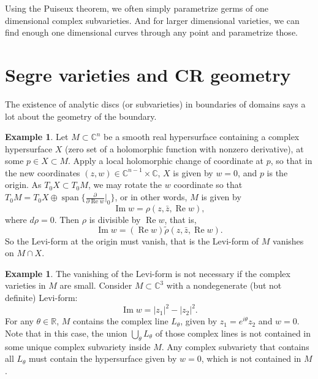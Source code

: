 \documentclass[12pt,openany]{book}
\renewcommand{\Re}{\operatorname{Re}}
\renewcommand{\Im}{\operatorname{Im}}
\newcommand{\abs}[1]{\left\lvert {#1} \right\rvert}
\newcommand{\C}{{\mathbb{C}}}
\newcommand{\R}{{\mathbb{R}}}
\newcommand{\sectionnewpage}{}
\theoremstyle{plain}
\theoremstyle{remark}
\theoremstyle{definition}
\theoremstyle{exercise}
\theoremstyle{example}
\newtheorem{example}[thm]{Example}
\begin{document}
Using the Puiseux theorem, we often simply parametrize germs
of one dimensional complex subvarieties.  
And for larger dimensional varieties, we can find
enough one dimensional curves through any point and parametrize those.


\sectionnewpage
\section{Segre varieties and CR geometry} \label{sec:crgeomcr}

The existence of analytic discs (or subvarieties)
in boundaries of domains says a lot about the geometry of the boundary.

\begin{example}
Let $M \subset \C^n$ be a smooth real hypersurface containing
a complex hypersurface $X$ (zero set of a holomorphic function
with nonzero derivative), at some $p \in X \subset M$.
Apply a local holomorphic change of coordinate at $p$, so
that in the new coordinates
$(z,w) \in \C^{n-1} \times \C$,
$X$ is given by $w=0$, and $p$ is the origin.
As $T_0 X \subset T_0 M$, we may rotate the $w$ coordinate
so that $T_0 M = T_0 X \oplus \operatorname{span} \bigl\{
\frac{\partial}{\partial \Re w}\big|_0 \bigr\}$,
or in other words, $M$ is given by
\begin{equation*}
\Im w = \rho(z,\bar{z},\Re w) ,
\end{equation*}
where $d\rho = 0$.
Then $\rho$
is divisible by $\Re w$, that is,
\begin{equation*}
\Im w = (\Re w) \widetilde{\rho}(z,\bar{z},\Re w)  .
\end{equation*}
So the Levi-form at the origin must vanish,
that is the Levi-form of $M$ vanishes on $M \cap X$.
\end{example}

\begin{example}
The vanishing of the Levi-form is not necessary if the complex varieties in
$M$ are small.  Consider $M\subset \C^3$ with a nondegenerate (but not definite)
Levi-form:
\begin{equation*}
\Im w = \abs{z_1}^2-\abs{z_2}^2 .
\end{equation*}
For any $\theta \in \R$,
$M$ contains the complex line $L_\theta$,
given by $z_1 = e^{i\theta} z_2$ and
$w = 0$.  Note that in this case, the union $\bigcup_\theta L_\theta$ of those
complex lines is not
contained in some unique complex subvariety inside $M$.  Any complex
subvariety that contains all $L_\theta$ must contain the hypersurface given
by $w = 0$, which is not contained in $M$.
\end{example}
\end{document}
